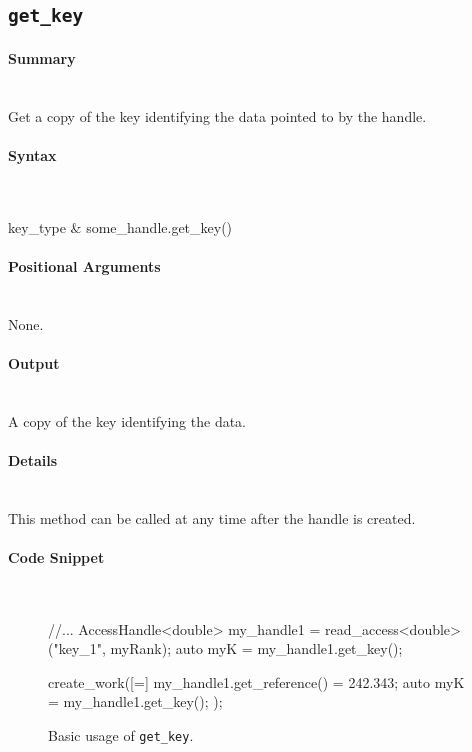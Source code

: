 \subsection{\texttt{get\_key}}

\paragraph{Summary}\mbox{}\\ 
Get a copy of the key identifying the data pointed to by the handle.

\paragraph{Syntax}\mbox{}\\ 
\begin{CppCode}
key_type & some_handle.get_key()
\end{CppCode}

\paragraph{Positional Arguments}\mbox{}\\ 
None.

\paragraph{Output}\mbox{}\\ 
A copy of the key identifying the data.

\paragraph{Details}\mbox{}\\ 
This method can be called at any time after the handle is created.


\paragraph{Code Snippet}\mbox{}\\ 
\begin{figure}[!h]
\begin{CppCodeNumb}
//...
AccessHandle<double> my_handle1 = read_access<double>("key_1", myRank);
auto myK = my_handle1.get_key();

create_work([=]{
	my_handle1.get_reference() = 242.343;
	auto myK = my_handle1.get_key();
});
\end{CppCodeNumb}
\label{fig:fe_api_get_key}
\caption{Basic usage of \texttt{get\_key}.}
\end{figure}




